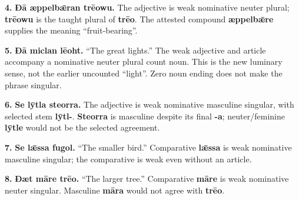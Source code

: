 \par\begin{minipage}{\linewidth}\raggedright
\textbf{4.} \textbf{Ðā æppelbǣran trēowu.} The adjective is weak nominative neuter plural; \textbf{trēowu} is the taught plural of \textbf{trēo}. The attested compound \textbf{æppelbǣre} supplies the meaning “fruit-bearing”.

\end{minipage}\par\addvspace{4pt}

\par\begin{minipage}{\linewidth}\raggedright
\textbf{5.} \textbf{Ðā miclan lēoht.} “The great lights.” The weak adjective and article accompany a nominative neuter plural count noun. This is the new luminary sense, not the earlier uncounted “light”. Zero noun ending does not make the phrase singular.

\end{minipage}\par\addvspace{4pt}

\par\begin{minipage}{\linewidth}\raggedright
\textbf{6.} \textbf{Se lȳtla steorra.} The adjective is weak nominative masculine singular, with selected stem \textbf{lȳtl-}. \textbf{Steorra} is masculine despite its final \textbf{-a}; neuter/\allowbreak{}feminine \textbf{lȳtle} would not be the selected agreement.

\end{minipage}\par\addvspace{4pt}

\par\begin{minipage}{\linewidth}\raggedright
\textbf{7.} \textbf{Se lǣssa fugol.} “The smaller bird.” Comparative \textbf{lǣssa} is weak nominative masculine singular; the comparative is weak even without an article.

\end{minipage}\par\addvspace{4pt}

\par\begin{minipage}{\linewidth}\raggedright
\textbf{8.} \textbf{Ðæt māre trēo.} “The larger tree.” Comparative \textbf{māre} is weak nominative neuter singular. Masculine \textbf{māra} would not agree with \textbf{trēo}.

\end{minipage}\par\addvspace{4pt}

